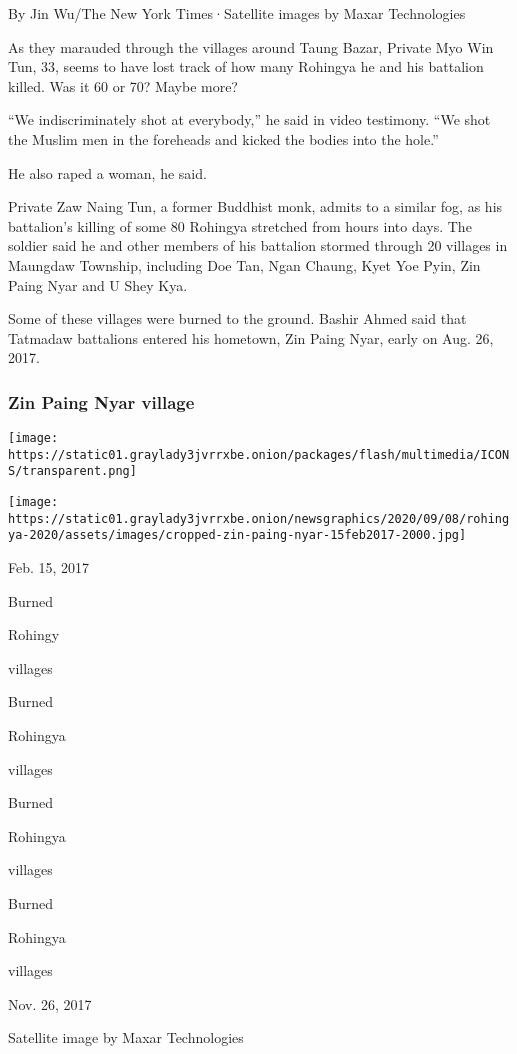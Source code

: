 By Jin Wu/The New York Times·Satellite images by Maxar Technologies

As they marauded through the villages around Taung Bazar, Private Myo
Win Tun, 33, seems to have lost track of how many Rohingya he and his
battalion killed. Was it 60 or 70? Maybe more?

``We indiscriminately shot at everybody,'' he said in video testimony.
``We shot the Muslim men in the foreheads and kicked the bodies into the
hole.''

He also raped a woman, he said.

Private Zaw Naing Tun, a former Buddhist monk, admits to a similar fog,
as his battalion's killing of some 80 Rohingya stretched from hours into
days. The soldier said he and other members of his battalion stormed
through 20 villages in Maungdaw Township, including Doe Tan, Ngan
Chaung, Kyet Yoe Pyin, Zin Paing Nyar and U Shey Kya.

Some of these villages were burned to the ground. Bashir Ahmed said that
Tatmadaw battalions entered his hometown, Zin Paing Nyar, early on Aug.
26, 2017.

\hypertarget{zin-paing-nyar-village}{%
\subsubsection{Zin Paing Nyar village}\label{zin-paing-nyar-village}}

\texttt{[image: https://static01.graylady3jvrrxbe.onion/packages/flash/multimedia/ICONS/transparent.png]}

\texttt{[image: https://static01.graylady3jvrrxbe.onion/newsgraphics/2020/09/08/rohingya-2020/assets/images/cropped-zin-paing-nyar-15feb2017-2000.jpg]}

Feb. 15, 2017

Burned

Rohingy

villages

Burned

Rohingya

villages

Burned

Rohingya

villages

Burned

Rohingya

villages

Nov. 26, 2017

Satellite image by Maxar Technologies

